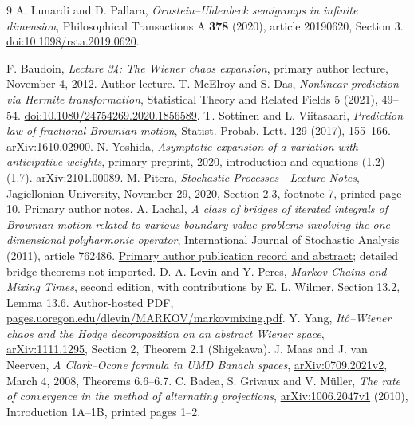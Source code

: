 \documentclass[11pt]{article}
\begin{document}
\clearpage
\begin{thebibliography}{9}
 A. Lunardi and D. Pallara,
\emph{Ornstein--Uhlenbeck semigroups in infinite dimension},
Philosophical Transactions A \textbf{378} (2020), article 20190620,
Section 3. \href{https://doi.org/10.1098/rsta.2019.0620}
{doi:10.1098/rsta.2019.0620}.

 F. Baudoin, \emph{Lecture 34: The Wiener chaos expansion},
primary author lecture, November 4, 2012.
\href{https://fabricebaudoin.blog/2012/11/04/lecture-34-the-wiener-chaos-expansion/}{Author lecture}.
 T. McElroy and S. Das,
\emph{Nonlinear prediction via Hermite transformation},
Statistical Theory and Related Fields 5 (2021), 49--54.
\href{https://doi.org/10.1080/24754269.2020.1856589}{doi:10.1080/24754269.2020.1856589}.
 T. Sottinen and L. Viitasaari,
\emph{Prediction law of fractional Brownian motion},
Statist. Probab. Lett. 129 (2017), 155--166.
\href{https://arxiv.org/abs/1610.02900}{arXiv:1610.02900}.
 N. Yoshida, \emph{Asymptotic expansion of a variation with anticipative weights}, primary preprint, 2020, introduction and equations (1.2)--(1.7). \href{https://arxiv.org/abs/2101.00089}{arXiv:2101.00089}.
 M. Pitera,
\emph{Stochastic Processes---Lecture Notes}, Jagiellonian University,
November 29, 2020, Section 2.3, footnote 7, printed page 10.
\href{https://www2.im.uj.edu.pl/MarcinPitera/files/StochasticProcesses.pdf}{Primary author notes}.
 A. Lachal, \emph{A class of bridges of iterated
integrals of Brownian motion related to various boundary value problems
involving the one-dimensional polyharmonic operator}, International
Journal of Stochastic Analysis (2011), article 762486.
\href{https://math.univ-lyon1.fr/~alachal/english_publications.html}
{Primary author publication record and abstract}; detailed bridge
theorems not imported.
 D. A. Levin and Y. Peres, \emph{Markov Chains and Mixing Times}, second edition, with contributions by E. L. Wilmer, Section 13.2, Lemma 13.6. Author-hosted PDF, \href{https://pages.uoregon.edu/dlevin/MARKOV/markovmixing.pdf}{pages.uoregon.edu/dlevin/MARKOV/markovmixing.pdf}.
 Y. Yang, \emph{It\^o--Wiener chaos and the Hodge decomposition on an abstract Wiener space}, \href{https://arxiv.org/pdf/1111.1295}{arXiv:1111.1295}, Section 2, Theorem 2.1 (Shigekawa).
 J. Maas and J. van Neerven, \emph{A Clark--Ocone formula in UMD Banach spaces}, \href{https://arxiv.org/pdf/0709.2021}{arXiv:0709.2021v2}, March 4, 2008, Theorems 6.6--6.7.
 C. Badea, S. Grivaux and V. M\"uller,
\emph{The rate of convergence in the method of alternating projections},
\href{https://arxiv.org/pdf/1006.2047}{arXiv:1006.2047v1} (2010),
Introduction 1A--1B, printed pages 1--2.
\end{thebibliography}
\end{document}

